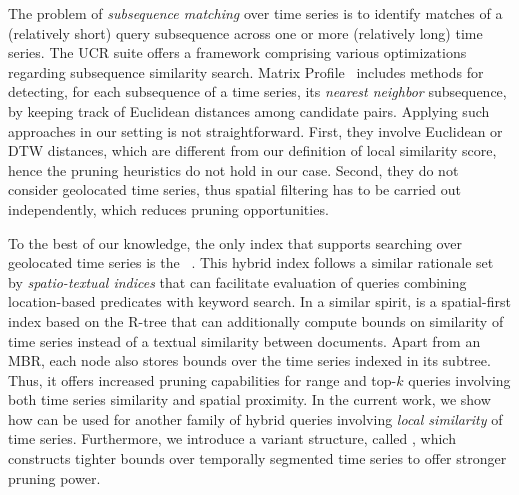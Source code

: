 The problem of {\em subsequence matching} over time series is to identify matches of a (relatively short) query subsequence across one or more (relatively long) time series. The UCR suite \cite{rakthanmanon2012searching} offers a framework comprising various optimizations regarding subsequence similarity search. Matrix Profile~\cite{yeh2016matrix} includes methods for detecting, for each subsequence of a time series, its \textit{nearest neighbor} subsequence, by keeping track of Euclidean distances among candidate pairs. Applying such approaches in our setting is not straightforward. First, they involve Euclidean or DTW distances, which are different from our definition of local similarity score, hence the pruning heuristics do not hold in our case. Second, they do not consider geolocated time series, thus spatial filtering has to be carried out independently, which reduces pruning opportunities.




To the best of our knowledge, the only index that supports searching over geolocated time series is the \btsr~\cite{chatzig17btsr,DBLP:conf/gis/Chatzigeorgakidis18}. This hybrid index follows a similar rationale set by {\em spatio-textual indices} \cite{chen2013pvldb} that can facilitate evaluation of queries combining location-based predicates with keyword search. 
In a similar spirit, \btsr is a spatial-first index based on the R-tree that can additionally compute bounds on similarity of time series instead of a textual similarity between documents. Apart from an MBR, each node also stores bounds over the time series indexed in its subtree. Thus, it offers increased pruning capabilities for range and top-$k$ queries involving both time series similarity and spatial proximity. In the current work, we show how \btsr can be used for another family of hybrid queries involving {\em local similarity} of time series. Furthermore, we introduce a variant structure, called \sbtsr, which constructs tighter bounds over temporally segmented time series to offer stronger pruning power.




